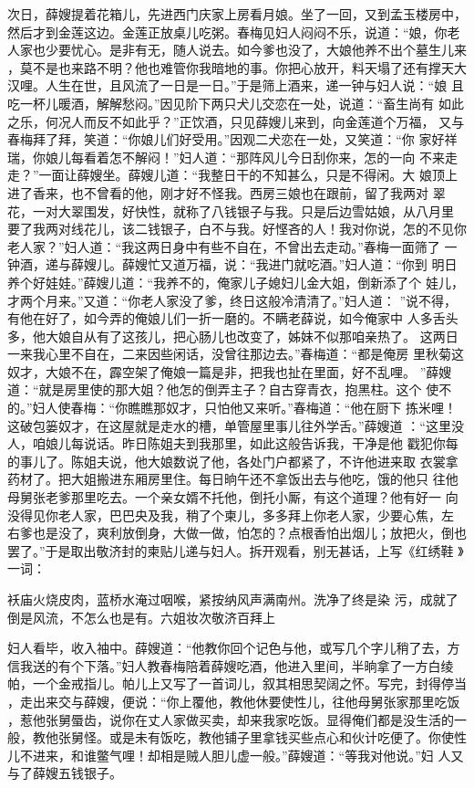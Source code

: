 次日，薛嫂提着花箱儿，先进西门庆家上房看月娘。坐了一回，又到孟玉楼房中，
然后才到金莲这边。金莲正放桌儿吃粥。春梅见妇人闷闷不乐，说道：“娘，你老
人家也少要忧心。是非有无，随人说去。如今爹也没了，大娘他养不出个墓生儿来
，莫不是也来路不明？他也难管你我暗地的事。你把心放开，料天塌了还有撑天大
汉哩。人生在世，且风流了一日是一日。”于是筛上酒来，递一钟与妇人说：“娘
且吃一杯儿暖酒，解解愁闷。”因见阶下两只犬儿交恋在一处，说道：“畜生尚有
如此之乐，何况人而反不如此乎？”正饮酒，只见薛嫂儿来到，向金莲道个万福，
又与春梅拜了拜，笑道：“你娘儿们好受用。”因观二犬恋在一处，又笑道：“你
家好祥瑞，你娘儿每看着怎不解闷！”妇人道：“那阵风儿今日刮你来，怎的一向
不来走走？”一面让薛嫂坐。薛嫂儿道：“我整日干的不知甚么，只是不得闲。大
娘顶上进了香来，也不曾看的他，刚才好不怪我。西房三娘也在跟前，留了我两对
翠花，一对大翠围发，好快性，就称了八钱银子与我。只是后边雪姑娘，从八月里
要了我两对线花儿，该二钱银子，白不与我。好悭吝的人！我对你说，怎的不见你
老人家？”妇人道：“我这两日身中有些不自在，不曾出去走动。”春梅一面筛了
一钟酒，递与薛嫂儿。薛嫂忙又道万福，说：“我进门就吃酒。”妇人道：“你到
明日养个好娃娃。”薛嫂儿道：“我养不的，俺家儿子媳妇儿金大姐，倒新添了个
娃儿，才两个月来。”又道：“你老人家没了爹，终日这般冷清清了。”妇人道：
”说不得，有他在好了，如今弄的俺娘儿们一折一磨的。不瞒老薛说，如今俺家中
人多舌头多，他大娘自从有了这孩儿，把心肠儿也改变了，姊妹不似那咱亲热了。
这两日一来我心里不自在，二来因些闲话，没曾往那边去。”春梅道：“都是俺房
里秋菊这奴才，大娘不在，霹空架了俺娘一篇是非，把我也扯在里面，好不乱哩。
”薛嫂道：“就是房里使的那大姐？他怎的倒弄主子？自古穿青衣，抱黑柱。这个
使不的。”妇人使春梅：“你瞧瞧那奴才，只怕他又来听。”春梅道：“他在厨下
拣米哩！这破包篓奴才，在这屋就是走水的槽，单管屋里事儿往外学舌。”薛嫂道
：“这里没人，咱娘儿每说话。昨日陈姐夫到我那里，如此这般告诉我，干净是他
戳犯你每的事儿了。陈姐夫说，他大娘数说了他，各处门户都紧了，不许他进来取
衣裳拿药材了。把大姐搬进东厢房里住。每日晌午还不拿饭出去与他吃，饿的他只
往他母舅张老爹那里吃去。一个亲女婿不托他，倒托小厮，有这个道理？他有好一
向没得见你老人家，巴巴央及我，稍了个柬儿，多多拜上你老人家，少要心焦，左
右爹也是没了，爽利放倒身，大做一做，怕怎的？点根香怕出烟儿；放把火，倒也
罢了。”于是取出敬济封的柬贴儿递与妇人。拆开观看，别无甚话，上写《红绣鞋
》一词：

袄庙火烧皮肉，蓝桥水淹过咽喉，紧按纳风声满南州。洗净了终是染
污，成就了倒是风流，不怎么也是有。六姐妆次敬济百拜上

妇人看毕，收入袖中。薛嫂道：“他教你回个记色与他，或写几个字儿稍了去，方
信我送的有个下落。”妇人教春梅陪着薛嫂吃酒，他进入里间，半晌拿了一方白绫
帕，一个金戒指儿。帕儿上又写了一首词儿，叙其相思契阔之怀。写完，封得停当
，走出来交与薛嫂，便说：“你上覆他，教他休要使性儿，往他母舅张家那里吃饭
，惹他张舅蜃齿，说你在丈人家做买卖，却来我家吃饭。显得俺们都是没生活的一
般，教他张舅怪。或是未有饭吃，教他铺子里拿钱买些点心和伙计吃便了。你使性
儿不进来，和谁鳖气哩！却相是贼人胆儿虚一般。”薛嫂道：“等我对他说。”妇
人又与了薛嫂五钱银子。

